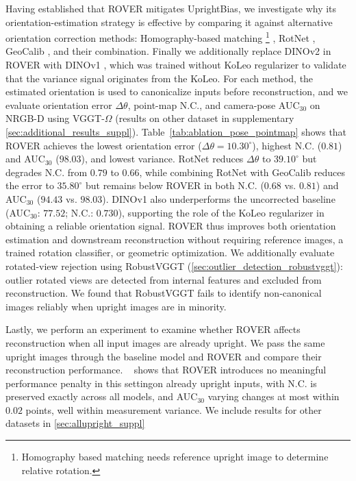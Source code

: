 Having established that ROVER mitigates UprightBias, we investigate why its orientation-estimation strategy is effective by comparing it against alternative orientation correction methods: Homography-based matching \footnote{Homography based matching needs reference upright image to determine relative rotation.} \citep{barath2019homography}, RotNet \citep{rotnet}, GeoCalib \citep{veicht2024geocalib}, and their combination. 
Finally we additionally replace DINOv2 in ROVER with DINOv1 \citep{caron2021dinov1}, which was trained without KoLeo regularizer to validate that the variance signal originates from the KoLeo. 
For each method, the estimated orientation is used to canonicalize inputs before reconstruction, and we evaluate orientation error $\Delta\theta$, point-map N.C., and camera-pose AUC$_{30}$ on NRGB-D using VGGT-$\Omega$ (results on other dataset in supplementary \cref{sec:additional_results_suppl}). 
Table~\ref{tab:ablation_pose_pointmap} shows that ROVER achieves the lowest orientation error ($\Delta\theta=10.30^\circ$), highest N.C. ($0.81$) and AUC$_{30}$ ($98.03$), and lowest variance.
RotNet reduces $\Delta\theta$ to $39.10^\circ$ but degrades N.C. from $0.79$ to $0.66$, while combining RotNet with GeoCalib reduces the error to $35.80^\circ$ but remains below ROVER in both N.C. ($0.68$ vs. $0.81$) and AUC$_{30}$ ($94.43$ vs. $98.03$). 
DINOv1 also underperforms the uncorrected baseline (AUC$_{30}$: $77.52$; N.C.: $0.730$), supporting the role of the KoLeo regularizer in obtaining a reliable orientation signal.
ROVER thus improves both orientation estimation and downstream reconstruction without requiring reference images, a trained rotation classifier, or geometric optimization.
We additionally evaluate rotated-view rejection using RobustVGGT \citep{robustvggt} (\cref{sec:outlier_detection_robustvggt}): outlier rotated views are detected from internal features and excluded from reconstruction. We found that RobustVGGT fails to identify non-canonical images reliably when upright images are in minority.

Lastly, we perform an experiment to examine whether ROVER affects reconstruction when all input images are already upright. 
We pass the same upright images through the baseline model and ROVER and compare their reconstruction performance.
~ shows that ROVER introduces no meaningful performance penalty in this settingon already upright inputs, with N.C. is preserved exactly across all models, and AUC$_{30}$ varying changes at most within $0.02$ points, well within measurement variance. We include results for other datasets in \cref{sec:allupright_suppl}